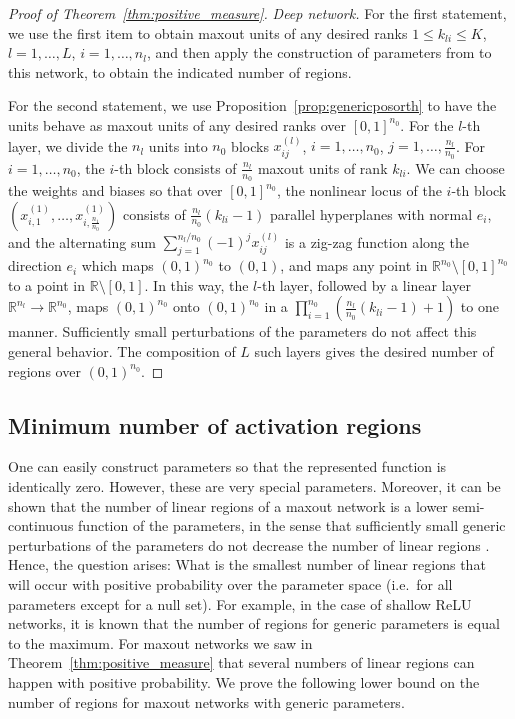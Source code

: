 \documentclass{article}
\theoremstyle{definition}
\begin{document}
\begin{proof}[Proof of Theorem~\ref{thm:positive_measure}]
\emph{Deep network.} For the first statement, we use the first item to obtain maxout units of any desired ranks $1\leq k_{li}\leq K$, $l=1,\ldots, L$, $i=1,\ldots, {n_l}$, and then apply the construction of parameters from \citet[Proposition~3.11]{sharp2021} to this network, to obtain the indicated number of regions. 

For the second statement, we use Proposition~\ref{prop:genericposorth} to have the units behave as maxout units of any desired ranks over $[0,1]^{n_0}$.
For the $l$-th layer, we divide the $n_l$ units into $n_0$ blocks $x^{(l)}_{ij}$, $i=1,\ldots, n_0$, $j=1,\ldots, \frac{n_l}{n_0}$. 
For $i=1,\ldots, n_0$, the $i$-th block consists of $\frac{n_l}{n_0}$ maxout units of rank $k_{li}$.
We can choose the weights and biases so that over $[0,1]^{n_0}$, the nonlinear locus of the $i$-th block $(x^{(1)}_{i,1},\ldots, x^{(1)}_{i,\frac{n_1}{n_0}})$ consists of $\frac{n_l}{n_0}(k_{li}-1)$ parallel hyperplanes with normal $e_i$, and the alternating sum $\sum_{j=1}^{n_l/n_0}(-1)^j x^{(l)}_{ij}$ is a zig-zag function along the direction $e_i$ which maps $(0,1)^{n_0}$ to $(0,1)$, and maps any point in $\mathbb{R}^{n_0}\setminus [0,1]^{n_0}$ to a point in $\mathbb{R}\setminus [0,1]$.
In this way, the $l$-th layer, followed by a linear layer $\mathbb{R}^{n_l}\to\mathbb{R}^{n_0}$, maps $(0,1)^{n_0}$ onto $(0,1)^{n_0}$ in a $\prod_{i=1}^{n_0}(\frac{n_l}{n_0}(k_{li}-1)+1)$ to one manner. 
Sufficiently small perturbations of the parameters do not affect this general behavior.
The composition of $L$ such layers gives the desired number of regions over $(0,1)^{n_0}$. 
\end{proof}

\subsection{Minimum number of activation regions} 

One can easily construct parameters so that the represented function is identically zero. However, these are very special parameters. 
Moreover, it can be shown that the number of linear regions of a maxout network is a lower semi-continuous function of the parameters, in the sense that sufficiently small generic perturbations of the parameters do not decrease the number of linear regions \citep[Proposition~3.2]{sharp2021}. 
Hence, the question arises: What is the smallest number of linear regions that will occur with positive probability over the parameter space (i.e.\ for all parameters except for a null set).
For example, in the case of shallow ReLU networks, it is known that the number of regions for generic parameters is equal to the maximum.
For maxout networks we saw in Theorem~\ref{thm:positive_measure} that several numbers of linear regions can happen with positive probability. 
%
We prove the following lower bound on the number of regions for maxout networks with generic parameters. 
\end{document}
